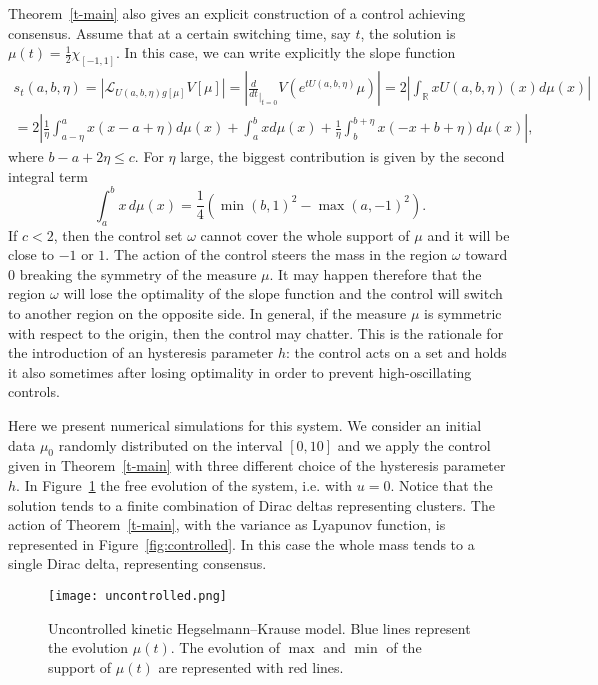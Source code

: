 \documentclass{article}
\newcommand{\R}{\mathbb{R}}
\renewcommand{\L}{\mathcal{L}}
\theoremstyle{definition}\newtheorem{remark}{Remark}
\begin{document}
Theorem~\ref{t-main} also gives an explicit construction of a control achieving consensus. Assume that at a certain switching time, say $t$, the solution is $\mu(t) = \frac{1}{2}\chi_{[-1,1]}$.  
In this case, we can write explicitly the slope function 
\begin{multline*}
s_t(a,b,\eta) = |\L_{U(a,b,\eta)g[\mu]}V[\mu]| 
=  |\frac{d}{dt}_{|_{t=0}} V(e^{t U(a,b,\eta)} \mu)| 
= 2|\int_{\R} x U(a,b,\eta)(x) d\mu(x)|\\
= 2 \left|\frac{1}{\eta} \int_{a-\eta}^a x(x-a+\eta) d\mu(x) + \int_a^b x d\mu(x) +\frac{1}{\eta} \int_b^{b+\eta} x(- x+b + \eta) d\mu(x) \right|   ,
\end{multline*}
where $b-a+2\eta \leq c$.
For $\eta$ large, the biggest contribution is given by the second integral term 
$$
\int_a^b x \, d\mu(x) = \frac{1}{4}\left(\min(b,1)^2 - \max(a,-1)^2\right).
$$
If $c<2$, then the control set $\omega$ cannot cover the whole support of $\mu$ and it will be close to $-1$ or $1$. The action of the control steers the mass in the region $\omega$ toward $0$ breaking the symmetry of the measure $\mu$. It may happen therefore that the region $\omega$ will lose the optimality of the slope function and the control will switch to another region on the opposite side. In general, if the measure $\mu$ is symmetric with respect to the origin, then the control may chatter. This is the rationale for the introduction of an hysteresis parameter $h$: the control acts on a set and holds it also sometimes after losing optimality in order to prevent high-oscillating controls.

Here we present numerical simulations for this system. We consider an initial data $\mu_0$ randomly distributed on the interval $[0,10]$ and we apply the control given in Theorem~\ref{t-main} with three different choice of the hysteresis parameter $h$. In Figure~\ref{fig:uncontrolled} the free evolution of the system, i.e. with $u=0$. Notice that the solution tends to a finite combination of Dirac deltas representing clusters. The action of Theorem~\ref{t-main}, with the variance as Lyapunov function, is represented in Figure~\ref{fig:controlled}. In this case the whole mass tends to a single Dirac delta, representing consensus. 


\begin{figure}[ht]
\begin{center}
\texttt{[image: uncontrolled.png]}
\caption{Uncontrolled kinetic Hegselmann--Krause model. Blue lines represent the evolution $\mu(t)$. The evolution of $\max$ and $\min$ of the support of $\mu(t)$ are represented with red lines.}
\label{fig:uncontrolled}
\end{center}
\end{figure}
\end{document}
